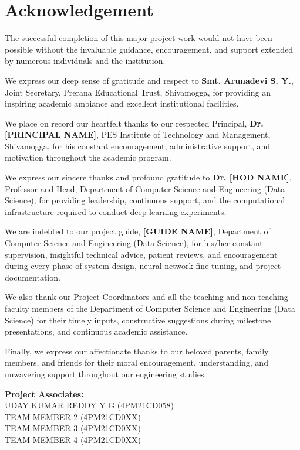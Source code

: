 \chapter*{Acknowledgement}

The successful completion of this major project work would not have been possible without the invaluable guidance, encouragement, and support extended by numerous individuals and the institution.

We express our deep sense of gratitude and respect to \textbf{Smt. Arunadevi S. Y.}, Joint Secretary, Prerana Educational Trust, Shivamogga, for providing an inspiring academic ambiance and excellent institutional facilities.

We place on record our heartfelt thanks to our respected Principal, \textbf{Dr. [PRINCIPAL NAME]}, PES Institute of Technology and Management, Shivamogga, for his constant encouragement, administrative support, and motivation throughout the academic program.

We express our sincere thanks and profound gratitude to \textbf{Dr. [HOD NAME]}, Professor and Head, Department of Computer Science and Engineering (Data Science), for providing leadership, continuous support, and the computational infrastructure required to conduct deep learning experiments.

We are indebted to our project guide, \textbf{[GUIDE NAME]}, Department of Computer Science and Engineering (Data Science), for his/her constant supervision, insightful technical advice, patient reviews, and encouragement during every phase of system design, neural network fine-tuning, and project documentation.

We also thank our Project Coordinators and all the teaching and non-teaching faculty members of the Department of Computer Science and Engineering (Data Science) for their timely inputs, constructive suggestions during milestone presentations, and continuous academic assistance.

Finally, we express our affectionate thanks to our beloved parents, family members, and friends for their moral encouragement, understanding, and unwavering support throughout our engineering studies.

\vspace{1.5cm}
\noindent
\textbf{Project Associates:}\\
UDAY KUMAR REDDY Y G (4PM21CD058)\\
TEAM MEMBER 2 (4PM21CD0XX)\\
TEAM MEMBER 3 (4PM21CD0XX)\\
TEAM MEMBER 4 (4PM21CD0XX)
